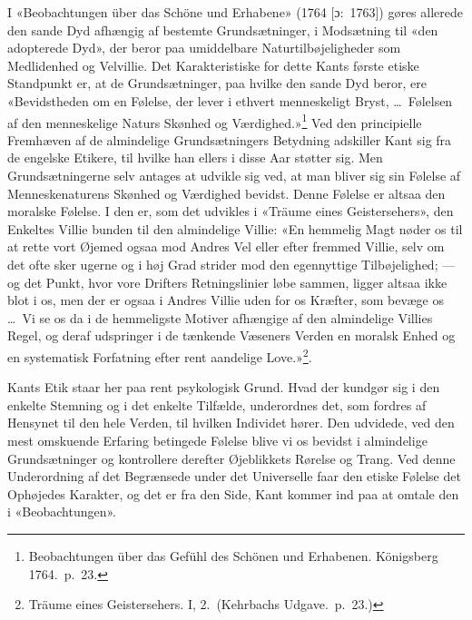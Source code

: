 \documentclass[12pt,a4paper]{article}
\newcommand{\apage}[1]{\marginnote{\footnotesize\textit{[#1]}}}
\begin{document}
I «Beobachtungen über das Schöne und Erhabene» (1764 [ɔ:\ 1763]) gøres
allerede den sande Dyd afhængig af bestemte Grundsætninger, i Modsætning
til «den adopterede Dyd», der beror paa umiddelbare Naturtilbøjeligheder
som Medlidenhed og Velvillie. Det Karakteristiske for dette Kants første
etiske Standpunkt er, at de Grundsætninger, paa hvilke den sande Dyd
beror, ere «Bevidstheden om en Følelse, der lever i ethvert menneskeligt
Bryst, \ldots\ Følelsen af den menneskelige Naturs Skønhed og
Værdighed.»\footnote{Beobachtungen über das Gefühl des Schönen
und Erhabenen. Königsberg 1764.\ p.\ 23.} Ved den principielle Fremhæven
af de almindelige Grundsætningers Betydning adskiller Kant sig fra de
engelske Etikere, til hvilke han ellers i disse Aar støtter sig. Men
Grundsætningerne selv antages at udvikle sig ved, at man bliver sig sin
Følelse af Menneskenaturens Skønhed og Værdighed bevidst. Denne Følelse
er altsaa den moralske Følelse. I den er, som det udvikles i «Träume
eines Geistersehers», den Enkeltes Villie bunden til den almindelige
Villie: «En hemmelig Magt nøder os til at rette vort Øjemed ogsaa mod
Andres Vel eller efter fremmed Villie, selv om det ofte sker ugerne og i
høj Grad strider mod den egennyttige Tilbøjelighed; --- og det Punkt,
hvor vore Drifters Retningslinier løbe sammen, ligger altsaa ikke blot i
os, men der er ogsaa i Andres Villie uden for os Kræfter, som bevæge os
\ldots\ Vi se os da i de hemmeligste Motiver afhængige af den almindelige
Villies Regel, og deraf udspringer i de tænkende Væseners Verden en
moralsk Enhed og en systematisk Forfatning efter rent aandelige
Love.»\footnote{Träume eines Geistersehers. I, 2.\ (Kehrbachs
Udgave.\ p.\ 23.)}.

Kants Etik staar her paa rent psykologisk Grund. Hvad der kundgør sig i
den enkelte Stemning og i det enkelte Tilfælde, underordnes det, som
fordres af Hensynet til den hele Verden, til hvilken Individet hører. Den
udvidede, ved den mest omskuende Erfaring betingede Følelse blive vi os
bevidst i almindelige Grundsætninger og kontrollere derefter Øjeblikkets
Rørelse og Trang. Ved denne Underordning af det Begrænsede under det
\apage{40} Universelle faar den etiske Følelse det Ophøjedes Karakter, og det er fra
den Side, Kant kommer ind paa at omtale den i «Beobachtungen».
\end{document}

